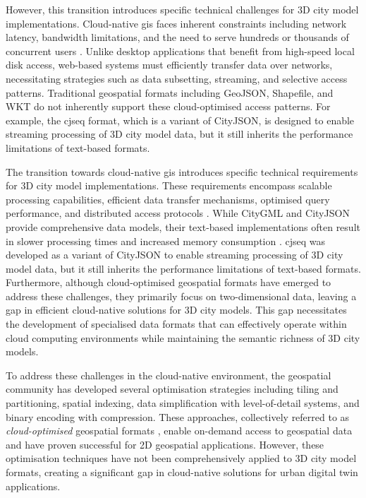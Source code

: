 However, this transition introduces specific technical challenges for 3D city model implementations.
Cloud-native \ac{gis} faces inherent constraints including network latency, bandwidth limitations, and the need to serve hundreds or thousands of concurrent users \citep{alesheikh_2002}.
Unlike desktop applications that benefit from high-speed local disk access, web-based systems must efficiently transfer data over networks, necessitating strategies such as data subsetting, streaming, and selective access patterns.
Traditional geospatial formats including GeoJSON, Shapefile, and WKT do not inherently support these cloud-optimised access patterns.
For example, the \ac{cjseq} format, which is a variant of CityJSON, is designed to enable streaming processing of 3D city model data, but it still inherits the performance limitations of text-based formats.

The transition towards cloud-native \ac{gis} introduces specific technical requirements for 3D city model implementations.
These requirements encompass scalable processing capabilities, efficient data transfer mechanisms, optimised query performance, and distributed access protocols \citep{cloud-optimised-formats}.
While CityGML and CityJSON provide comprehensive data models, their text-based implementations often result in slower processing times and increased memory consumption \citep{jordi_van_liempt_2020}. \ac{cjseq} was developed as a variant of CityJSON to enable streaming processing of 3D city model data, but it still inherits the performance limitations of text-based formats.
Furthermore, although cloud-optimised geospatial formats have emerged to address these challenges, they primarily focus on two-dimensional data, leaving a gap in efficient cloud-native solutions for 3D city models.
This gap necessitates the development of specialised data formats that can effectively operate within cloud computing environments while maintaining the semantic richness of 3D city models.

To address these challenges in the cloud-native environment, the geospatial community has developed several optimisation strategies including tiling and partitioning, spatial indexing, data simplification with level-of-detail systems, and binary encoding with compression.
These approaches, collectively referred to as \emph{cloud-optimised} geospatial formats \citep{cloud-optimised-formats}, enable on-demand access to geospatial data and have proven successful for 2D geospatial applications.
However, these optimisation techniques have not been comprehensively applied to 3D city model formats, creating a significant gap in cloud-native solutions for urban digital twin applications.

